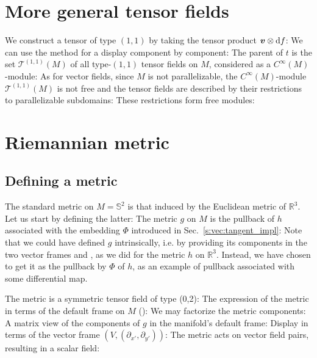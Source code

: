 \section{More general tensor fields}

We construct a tensor of type $(1,1)$ by taking the tensor product
$\bm{v}\otimes \mathrm{d}f$:
We can use the method  for a display component by
component:
The parent of $t$ is the set $\mathcal{T}^{(1,1)}(M)$ of all type-$(1,1)$
tensor fields on $M$,
considered as a $C^\infty(M)$-module:
As for vector fields, since $M$ is not parallelizable, the $C^\infty(M)$-module
$\mathcal{T}^{(1,1)}(M)$ is not free and the tensor fields are described by
their restrictions to parallelizable subdomains:
These restrictions form free modules:

\section{Riemannian metric}

\subsection{Defining a metric}

The standard metric on $M=\mathbb{S}^2$ is that induced by the Euclidean metric of $\mathbb{R}^3$. Let us start by defining the latter:
The metric $g$ on $M$ is the pullback of $h$ associated with the embedding $\Phi$
introduced in Sec.~\ref{s:vec:tangent_impl}:
Note that we could have defined $g$ intrinsically, i.e. by providing its components in the two vector frames  and , as we did for the metric $h$ on $\mathbb{R}^3$. Instead, we have chosen to get it as the pullback by $\Phi$ of $h$, as an example of pullback associated with some differential map.

The metric is a symmetric tensor field of type (0,2):
The expression of the metric in terms of the default frame on $M$ ():
We may factorize the metric components:
A matrix view of the components of $g$ in the manifold's default frame:
Display in terms of the vector frame $(V, (\partial_{x'}, \partial_{y'}))$:
The metric acts on vector field pairs, resulting in a scalar field:

